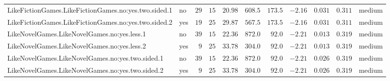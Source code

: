 \documentclass[6pt]{article}
\begin{document}
\begin{landscape}
{\begin{longtable}{llrrrrrrrrl}
LikeFictionGames.LikeFictionGames.no:yes.two.sided.1&no&$29$&$15$&$20.98$&$608.5$&$173.5$&$-2.16$&$0.031$&$0.311$&medium\tabularnewline
LikeFictionGames.LikeFictionGames.no:yes.two.sided.2&yes&$19$&$25$&$29.87$&$567.5$&$173.5$&$-2.16$&$0.031$&$0.311$&medium\tabularnewline
LikeNovelGames.LikeNovelGames.no:yes.less.1&no&$39$&$15$&$22.36$&$872.0$&$ 92.0$&$-2.21$&$0.013$&$0.319$&medium\tabularnewline
LikeNovelGames.LikeNovelGames.no:yes.less.2&yes&$ 9$&$25$&$33.78$&$304.0$&$ 92.0$&$-2.21$&$0.013$&$0.319$&medium\tabularnewline
LikeNovelGames.LikeNovelGames.no:yes.two.sided.1&no&$39$&$15$&$22.36$&$872.0$&$ 92.0$&$-2.21$&$0.026$&$0.319$&medium\tabularnewline
LikeNovelGames.LikeNovelGames.no:yes.two.sided.2&yes&$ 9$&$25$&$33.78$&$304.0$&$ 92.0$&$-2.21$&$0.026$&$0.319$&medium\tabularnewline
\hline
\end{longtable}}\end{landscape}
\end{document}
